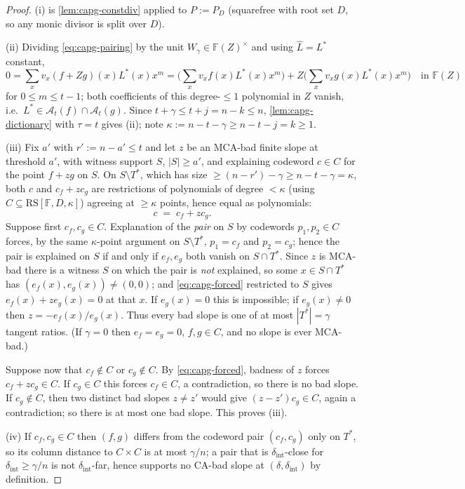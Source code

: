 \documentclass[11pt]{article}
\theoremstyle{definition}
\theoremstyle{remark}
\newcommand{\F}{\mathbb{F}}
\begin{document}
\begin{proof}
(i) is \cref{lem:capg-constdiv} applied to $P:=P_D$ (squarefree with root set
$D$, so any monic divisor is split over $D$).

(ii)  Dividing \eqref{eq:capg-pairing} by the unit $W_\gamma\in\F(Z)^\times$
and using $\widehat{L}=L^{*}$ constant,
\[
0=\sum_x v_x (f+Zg)(x)L^{*}(x)x^m
=\Big(\sum_x v_x f(x)L^{*}(x)x^m\Big)
+Z\Big(\sum_x v_x g(x)L^{*}(x)x^m\Big)
\quad\text{in }\F(Z)
\]
for $0\leq m\leq t-1$; both coefficients of this degree-$\leq1$ polynomial
in $Z$ vanish, i.e.\ $L^{*}\in\mathcal{A}_t(f)\cap\mathcal{A}_t(g)$.  Since
$t+\gamma\leq t+j=n-k\leq n$, \cref{lem:capg-dictionary} with $\tau=t$ gives
(ii); note $\kappa:=n-t-\gamma\geq n-t-j=k\geq 1$.

(iii)  Fix $a'$ with $r':=n-a'\leq t$ and let $z$ be an MCA-bad finite slope
at threshold $a'$, with witness support $S$, $|S|\geq a'$, and explaining
codeword $c\in C$ for the point $f+zg$ on $S$.  On
$S\setminus T^{*}$, which has size $\geq(n-r')-\gamma\geq n-t-\gamma=\kappa$,
both $c$ and $c_f+zc_g$ are restrictions of polynomials of degree
$<\kappa$ (using $C\subseteq \mathrm{RS}[\F,D,\kappa]$) agreeing at
$\geq\kappa$ points, hence equal as polynomials:
\begin{equation}\label{eq:capg-forced}
c \;=\; c_f+zc_g .
\end{equation}
Suppose first $c_f,c_g\in C$.  Explanation of the \emph{pair} on $S$ by
codewords $p_1,p_2\in C$ forces, by the same $\kappa$-point argument on
$S\setminus T^{*}$, $p_1=c_f$ and $p_2=c_g$; hence the pair is explained on
$S$ if and only if $e_f,e_g$ both vanish on $S\cap T^{*}$.  Since $z$ is
MCA-bad there is a witness $S$ on which the pair is \emph{not} explained, so
some $x\in S\cap T^{*}$ has $(e_f(x),e_g(x))\neq(0,0)$; and
\eqref{eq:capg-forced} restricted to $S$ gives $e_f(x)+ze_g(x)=0$ at that
$x$.  If $e_g(x)=0$ this is impossible; if $e_g(x)\neq0$ then
$z=-e_f(x)/e_g(x)$.  Thus every bad slope is one of at most
$|T^{*}|=\gamma$ tangent ratios.  (If $\gamma=0$ then $e_f=e_g=0$,
$f,g\in C$, and no slope is ever MCA-bad.)

Suppose now that $c_f\notin C$ or $c_g\notin C$.  By
\eqref{eq:capg-forced}, badness of $z$ forces $c_f+zc_g\in C$.  If
$c_g\in C$ this forces $c_f\in C$, a contradiction, so there is no bad
slope.  If $c_g\notin C$, then two distinct bad slopes $z\neq z'$ would give
$(z-z')c_g\in C$, again a contradiction; so there is at most one bad slope.
This proves (iii).

(iv)  If $c_f,c_g\in C$ then $(f,g)$ differs from the codeword pair
$(c_f,c_g)$ only on $T^{*}$, so its column distance to $C\times C$ is at
most $\gamma/n$; a pair that is $\delta_{\mathrm{int}}$-close for
$\delta_{\mathrm{int}}\geq\gamma/n$ is not
$\delta_{\mathrm{int}}$-far, hence supports no CA-bad slope at
$(\delta,\delta_{\mathrm{int}})$ by definition.
\end{proof}
\end{document}
